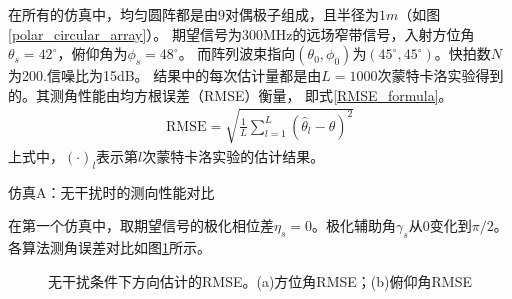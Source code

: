 \documentclass[master]{thesis-uestc}
\begin{document}
在所有的仿真中，均匀圆阵都是由$9$对偶极子组成，且半径为$1m$（如图\ref{polar_circular_array}）。
期望信号为300MHz的远场窄带信号，入射方位角$\theta_s=42^\circ$，俯仰角为$\phi_s=48^\circ$。
而阵列波束指向$(\theta_0,\phi_0)$为$(45^\circ,45^\circ)$。快拍数$N$为200.信噪比为15dB。
结果中的每次估计量都是由$L=1000$次蒙特卡洛实验得到的。其测角性能由均方根误差（RMSE）衡量，
即式\eqref{RMSE_formula}。
\begin{equation}\label{RMSE_formula}
    \begin{aligned}
        \text{RMSE} = \sqrt{\frac{1}{L}\sum_{l=1}^L\left(\hat{\theta}_l-\theta\right)^2}
    \end{aligned}
\end{equation}
上式中，$(\cdot)_l$表示第$l$次蒙特卡洛实验的估计结果。

仿真A：无干扰时的测向性能对比

在第一个仿真中，取期望信号的极化相位差$\eta_s=0$。极化辅助角$\gamma_s$从$0$变化到$\pi/2$。
各算法测角误差对比如图\ref{Polar_RMSE_jammer_free}所示。
\begin{figure}[h]
    \floatcontinue
    \caption{无干扰条件下方向估计的RMSE。(a)方位角RMSE；(b)俯仰角RMSE}
    \label{Polar_RMSE_jammer_free}
\end{figure}
\end{document}
